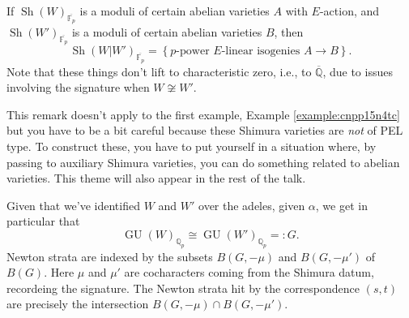 \documentclass[reqno]{amsart} 
\begin{document}
\begin{remark}
  If $\operatorname{Sh}(W)_{\overline{\mathbb{F}_p}}$ is a moduli of certain abelian varieties $A$ with $E$-action, and $\operatorname{Sh}(W')_{\overline{\mathbb{F}_p}}$ is a moduli of certain abelian varieties $B$, then
  \begin{equation*}
    \operatorname{Sh}(W | W')_{\overline{\mathbb{F}_p}} = \left\{ \text{$p$-power $E$-linear isogenies } A \rightarrow B \right\}.
  \end{equation*}
  Note that these things don't lift to characteristic zero, i.e., to $\overline{\mathbb{Q}}$, due to issues involving the signature when $W \not \cong W'$.
\end{remark}
This remark doesn't apply to the first example, Example \ref{example:cnpp15n4tc} but you have to be a bit careful because these Shimura varieties are \emph{not} of PEL type.  To construct these, you have to put yourself in a situation where, by passing to auxiliary Shimura varieties, you can do something related to abelian varieties.  This theme will also appear in the rest of the talk.

Given that we've identified $W$ and $W'$ over the adeles, given $\alpha$, we get in particular that
\begin{equation*}
  \operatorname{GU}(W)_{\mathbb{Q}_p}
  \cong 
  \operatorname{GU}(W')_{\mathbb{Q}_p} =: G.
\end{equation*}
Newton strata are indexed by the subsets $B(G, - \mu)$ and $B(G, - \mu ')$ of $B(G)$.  Here $\mu$ and $\mu '$ are cocharacters coming from the Shimura datum, recordeing the signature.  The Newton strata hit by the correspondence $(s,t)$ are precisely the intersection $B(G, - \mu ) \cap B(G, - \mu ')$.


{} 
\end{document}
